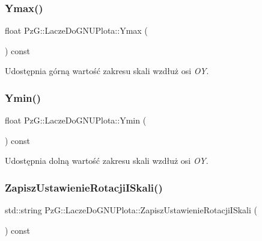 \subsubsection{\texorpdfstring{Ymax()}{Ymax()}}
{\footnotesize\ttfamily float Pz\+G\+::\+Lacze\+Do\+G\+N\+U\+Plota\+::\+Ymax (\begin{DoxyParamCaption}{ }\end{DoxyParamCaption}) const\hspace{0.3cm}{\ttfamily [inline]}}

Udostępnia górną wartość zakresu skali wzdłuż osi {\itshape OY}. \mbox{\label{classPzG_1_1LaczeDoGNUPlota_a9352c0382bfaeaaba9f65399a7383164}} 
\subsubsection{\texorpdfstring{Ymin()}{Ymin()}}
{\footnotesize\ttfamily float Pz\+G\+::\+Lacze\+Do\+G\+N\+U\+Plota\+::\+Ymin (\begin{DoxyParamCaption}{ }\end{DoxyParamCaption}) const\hspace{0.3cm}{\ttfamily [inline]}}

Udostępnia dolną wartość zakresu skali wzdłuż osi {\itshape OY}. \mbox{\label{classPzG_1_1LaczeDoGNUPlota_aa92b463e8cbae31b50dd797a4183bce8}} 
\subsubsection{\texorpdfstring{Zapisz\+Ustawienie\+Rotacji\+I\+Skali()}{ZapiszUstawienieRotacjiISkali()}}
{\footnotesize\ttfamily std\+::string Pz\+G\+::\+Lacze\+Do\+G\+N\+U\+Plota\+::\+Zapisz\+Ustawienie\+Rotacji\+I\+Skali (\begin{DoxyParamCaption}{ }\end{DoxyParamCaption}) const\hspace{0.3cm}{\ttfamily [protected]}}



